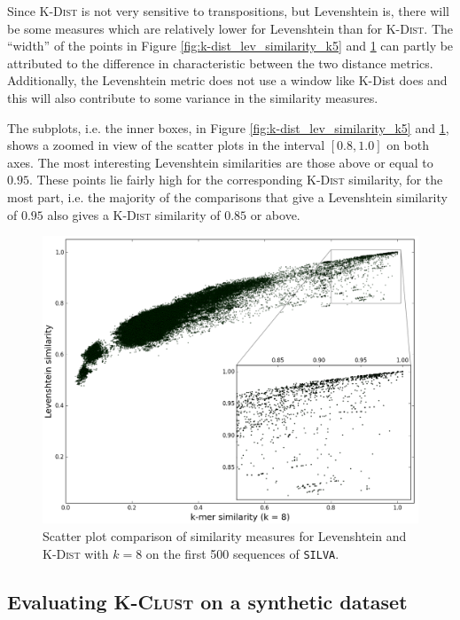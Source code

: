 Since \textsc{K-Dist} is not very sensitive to transpositions, but Levenshtein
is, there will be some measures which are relatively lower for Levenshtein than
for \textsc{K-Dist}. The ``width'' of the points in Figure
\ref{fig:k-dist_lev_similarity_k5} and \ref{fig:k-dist_lev_similarity_k8} can
partly be attributed to the difference in characteristic between the two
distance metrics. Additionally, the Levenshtein metric does not use a window
like K-Dist does and this will also contribute to some variance in the
similarity measures.


The subplots, i.e. the inner boxes, in Figure
\ref{fig:k-dist_lev_similarity_k5} and \ref{fig:k-dist_lev_similarity_k8},
shows a zoomed in view of the scatter plots in the interval $[0.8,1.0]$ on both
axes. The most interesting Levenshtein similarities are those above or equal to
$0.95$. These points lie fairly high for the corresponding \textsc{K-Dist}
similarity, for the most part, i.e. the majority of the comparisons that give a
Levenshtein similarity of $0.95$ also gives a \textsc{K-Dist} similarity of
$0.85$ or above.

\begin{figure}[h!]
  \includegraphics[width=1.0\textwidth]{graphics/Levenshtein_K-Dist_k8.png}
  \caption{Scatter plot comparison of similarity measures for Levenshtein and
    \textsc{K-Dist} with $k=8$ on the first 500 sequences of \texttt{SILVA}.}
  \label{fig:k-dist_lev_similarity_k8}
\end{figure}


\subsection{Evaluating \textsc{K-Clust} on a synthetic dataset}
\label{sec:synth_dataset}


